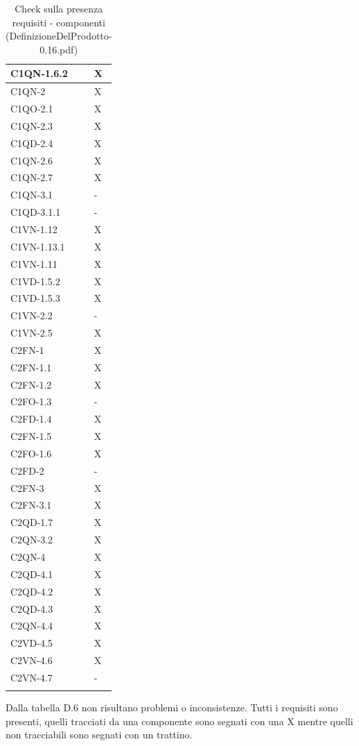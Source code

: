 \begin{footnotesize}
\begin{longtable}{|p{}|p{}|}
 C1QN-1.6.2&X   \\ \hline
 C1QN-2&X \\ \hline
 C1QO-2.1&X \\ \hline
 C1QN-2.3&X  \\ \hline
 C1QD-2.4&X  \\ \hline
 C1QN-2.6&X  \\ \hline
 C1QN-2.7&X    \\ \hline
 C1QN-3.1&-   \\ \hline
 C1QD-3.1.1&-    \\ \hline
 C1VN-1.12&X \\ \hline
 C1VN-1.13.1&X  \\ \hline
 C1VN-1.11&X  \\ \hline
 C1VD-1.5.2&X \\ \hline
 C1VD-1.5.3&X   \\ \hline
 C1VN-2.2&- \\ \hline
 C1VN-2.5&X  \\ \hline
 C2FN-1&X    \\ \hline
 C2FN-1.1&X    \\ \hline
 C2FN-1.2&X   \\ \hline
 C2FO-1.3&-    \\ \hline
 C2FD-1.4&X   \\ \hline
 C2FN-1.5&X   \\ \hline
 C2FO-1.6&X   \\ \hline
 C2FD-2&-    \\ \hline
 C2FN-3&X   \\ \hline
 C2FN-3.1&X   \\ \hline
 C2QD-1.7&X   \\ \hline
 C2QN-3.2&X   \\ \hline
 C2QN-4 &X  \\ \hline
 C2QD-4.1&X    \\ \hline
 C2QD-4.2&X   \\ \hline
 C2QD-4.3&X   \\ \hline
 C2QN-4.4&X  \\ \hline
 C2VD-4.5&X   \\ \hline
 C2VN-4.6&X    \\ \hline
 C2VN-4.7&-  \\ \hline

\caption{Check sulla presenza requisiti - componenti
(DefinizioneDelProdotto-0.16.pdf)}
\end{longtable}
\end{footnotesize}

Dalla tabella D.6 non risultano problemi o inconsistenze. Tutti i requisiti sono
presenti, quelli tracciati da una componente sono segnati con una X mentre
quelli non tracciabili sono segnati con un trattino.

